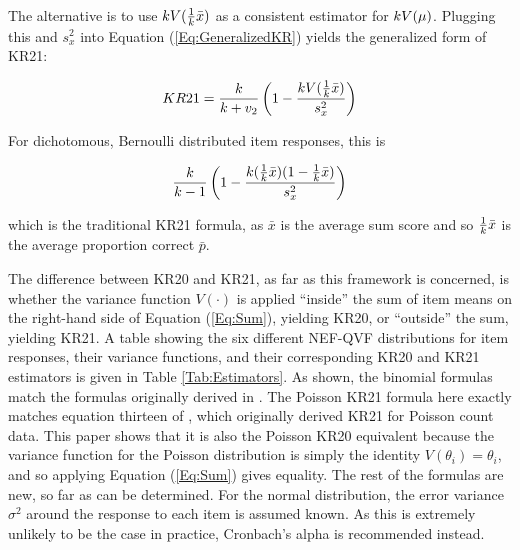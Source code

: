 \documentclass[12pt,epsfig]{article}
\newcommand{\changed}[1]{\textcolor{black}{#1}}
\newcommand{\testlength}{\changed{k}}%
\begin{document}
The alternative is to use $\testlength V(\frac{1}{\testlength} \bar{x})$ as a consistent estimator for $\testlength V(\mu)$. Plugging this and $s^2_x$ into Equation (\ref{Eq:GeneralizedKR}) yields the generalized form of KR21:

\begin{equation}
KR21  = \dfrac{\testlength}{\testlength + v_2} \left(1 - \dfrac{\testlength V(\frac{1}{\testlength} \bar{x})}{s^2_x}\right)
\label{Eq:KR21}
\end{equation}

\noindent For dichotomous, Bernoulli distributed item responses, this is

\begin{equation*}
\dfrac{\testlength}{\testlength-1}\left(1 - \dfrac{\testlength (\frac{1}{\testlength} \bar{x})(1 - \frac{1}{\testlength} \bar{x})}{s^2_x}\right)
\end{equation*}


\noindent which is the traditional KR21 formula, as $\bar{x}$ is the average sum score and so $\frac{1}{\testlength} \bar{x}$ is the average proportion correct $\bar{p}$.



The difference between KR20 and KR21, as far as this framework is concerned, is whether the variance function $V(\cdot)$ is applied ``inside'' the sum of item means on the right-hand side of Equation (\ref{Eq:Sum}), yielding KR20, or ``outside'' the sum, yielding KR21. A table showing the six different NEF-QVF distributions for item responses, their variance functions, and their corresponding KR20 and KR21 estimators is given  in Table \ref{Tab:Estimators}. As shown, the binomial formulas match the formulas originally derived in \cite{Kuder1937}. The Poisson KR21 formula here exactly matches equation thirteen of \cite{Allison1978}, which originally derived KR21 for Poisson count data. This paper shows that it is also the Poisson KR20 equivalent because the variance function for the Poisson distribution is simply the identity $V(\theta_i) = \theta_i$, and so applying Equation (\ref{Eq:Sum}) gives equality. The rest of the formulas are new, so far as can be determined.  For the normal distribution, the error variance $\sigma^2$ around the response to each item is assumed known. As this is extremely unlikely to be the case in practice, Cronbach's alpha is recommended instead.

\end{document}
